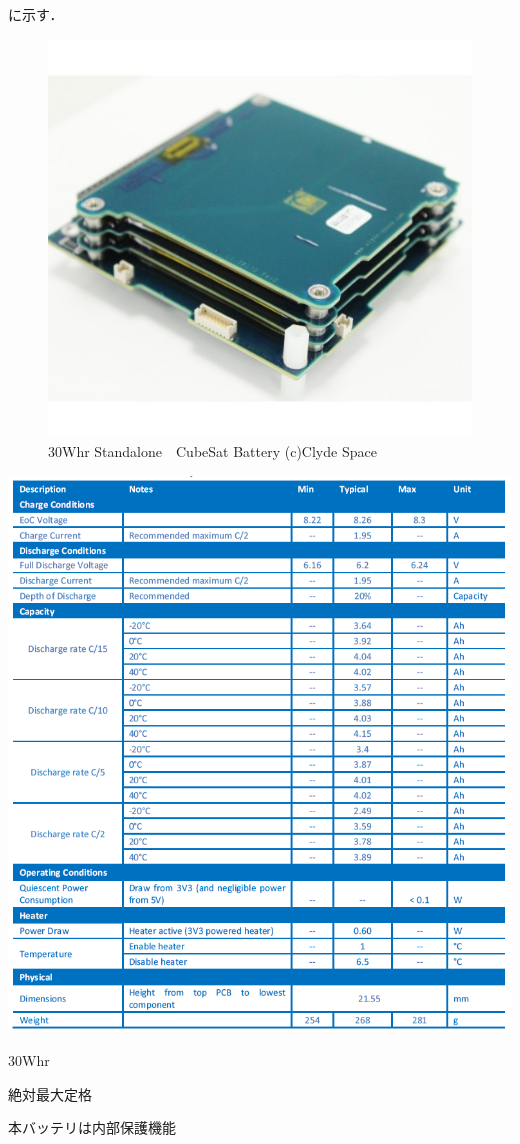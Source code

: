 に示す．

\begin{figure}[htbp]
	\begin{center}
		\includegraphics[width=0.5\linewidth]{./03/fig/battery.jpg}
		\caption{30Whr Standalone　CubeSat Battery (c)Clyde Space}
		\label{mir}
	\end{center}
\end{figure}

\begin{table}[htbp]
	\begin{center}
		\includegraphics[width=0.8\linewidth]{./03/fig/battery_spec.png}
		\caption{30Whr}
		\label{mir}
	\end{center}
\end{table}

絶対最大定格

本バッテリは内部保護機能

